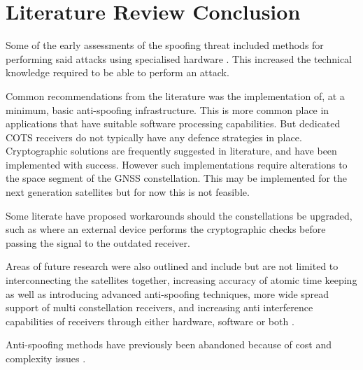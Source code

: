 \section{Literature Review Conclusion}
Some of the early assessments of the spoofing threat included methods for performing said attacks using specialised hardware \cite{RN23}. This increased the technical
knowledge required to be able to perform an attack.

Common recommendations from the literature was the implementation of, at a minimum, basic anti-spoofing infrastructure. This is more common place in applications that
have suitable software processing capabilities. But dedicated COTS receivers do not typically have any defence strategies in place.
Cryptographic solutions are frequently suggested in literature, and have been implemented with success. However such implementations require alterations to the space
segment of the GNSS constellation. This may be implemented for the next generation satellites but for now this is not feasible. 

Some literate have proposed workarounds should the constellations be upgraded, such as \cite{RN19} where an external device performs the cryptographic checks before
passing the signal to the outdated receiver.

Areas of future research were also outlined and include but are not limited to interconnecting the satellites together, increasing accuracy of
atomic time keeping as well as introducing advanced anti-spoofing techniques, more wide spread support of multi constellation receivers, and increasing anti interference
capabilities of receivers through either hardware, software or both \cite{RN33}.

Anti-spoofing methods have previously been abandoned because of cost and complexity issues \cite{RN7}.